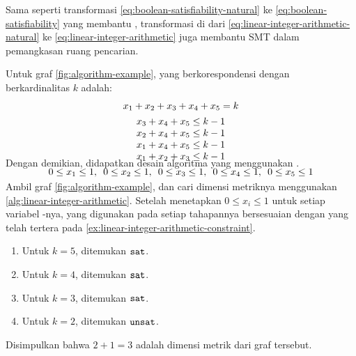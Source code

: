 Sama seperti transformasi \autoref{eq:boolean-satisfiability-natural} ke \autoref{eq:boolean-satisfiability} yang membantu , transformasi di  dari \autoref{eq:linear-integer-arithmetic-natural} ke \autoref{eq:linear-integer-arithmetic} juga membantu SMT dalam pemangkasan ruang pencarian.

\begin{example}
	Untuk graf \autoref{fig:algorithm-example},  yang berkorespondensi dengan  berkardinalitas \(k\) adalah:
	\[
		\smash[b]{
		\begin{array}{c}
			x_1 + x_2 + x_3 + x_4 + x_5 = k \\ [4pt]
			x_3 + x_4 + x_5 \leq k - 1 \\
			x_2 + x_4 + x_5 \leq k - 1 \\
			x_1 + x_4 + x_5 \leq k - 1 \\
			x_1 + x_2 + x_3 \leq k - 1 \\ [4pt]
			0 \leq x_1 \leq 1,\enspace
			0 \leq x_2 \leq 1,\enspace
			0 \leq x_3 \leq 1,\enspace
			0 \leq x_4 \leq 1,\enspace
			0 \leq x_5 \leq 1
		\end{array}
		} \vspace{1.25em}
	\]
	\label{ex:linear-integer-arithmetic-constraint}
\end{example}

\noindent Dengan demikian, didapatkan desain algoritma yang menggunakan .

\begin{example}
	Ambil graf \autoref{fig:algorithm-example}, dan cari dimensi metriknya menggunakan \autoref{alg:linear-integer-arithmetic}. Setelah menetapkan  \(0 \leq x_i \leq 1\) untuk setiap variabel -nya,  yang digunakan pada setiap tahapannya bersesuaian dengan yang telah tertera pada \autoref{ex:linear-integer-arithmetic-constraint}.
	\begin{enumerate}
		\item Untuk \(k = 5\), ditemukan \(\mathtt{sat}\).
		\item Untuk \(k = 4\), ditemukan \(\mathtt{sat}\).
		\item Untuk \(k = 3\), ditemukan \(\mathtt{sat}\).
		\item Untuk \(k = 2\), ditemukan \(\mathtt{unsat}\).
	\end{enumerate}
	Disimpulkan bahwa \(2 + 1 = 3\) adalah dimensi metrik dari graf tersebut.
\end{example}

